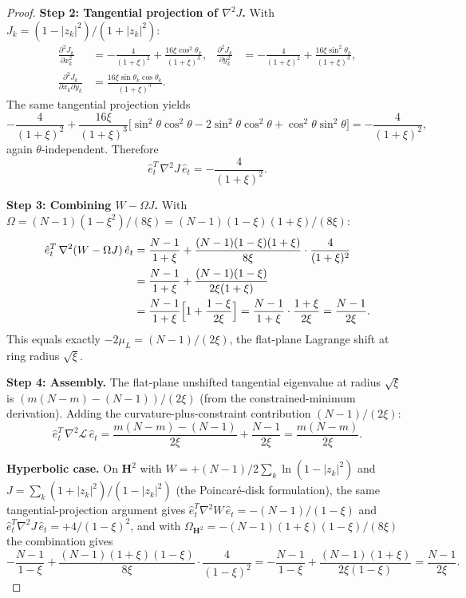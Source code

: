 \documentclass[11pt]{article}
\theoremstyle{remark}
\begin{document}
\begin{proof}
\textbf{Step 2: Tangential projection of $\nabla^2 J$.}
With $J_k = (1 - |z_k|^2)/(1 + |z_k|^2)$:
\begin{align*}
  \frac{\partial^2 J_k}{\partial x_k^2}
    &= -\frac{4}{(1+\xi)^2} + \frac{16\xi\cos^2\!\theta_k}{(1+\xi)^3},
  &
  \frac{\partial^2 J_k}{\partial y_k^2}
    &= -\frac{4}{(1+\xi)^2} + \frac{16\xi\sin^2\!\theta_k}{(1+\xi)^3},
  \\
  \frac{\partial^2 J_k}{\partial x_k\partial y_k}
    &= \frac{16\xi\sin\theta_k\cos\theta_k}{(1+\xi)^3}.
\end{align*}
The same tangential projection yields
\[
  -\frac{4}{(1+\xi)^2}
  + \frac{16\xi}{(1+\xi)^3}\bigl[\sin^2\!\theta\cos^2\!\theta
    - 2\sin^2\!\theta\cos^2\!\theta + \cos^2\!\theta\sin^2\!\theta\bigr]
  = -\frac{4}{(1+\xi)^2},
\]
again $\theta$-independent.  Therefore
\begin{equation}\label{eq:J-tt}
  \hat e_t^T\,\nabla^2 J\,\hat e_t = -\frac{4}{(1+\xi)^2}.
\end{equation}

\textbf{Step 3: Combining $W - \Omega J$.}
With $\Omega = (N-1)(1-\xi^2)/(8\xi) = (N-1)(1-\xi)(1+\xi)/(8\xi)$:
\begin{align*}
  \hat e_t^T\,\nabla^2(W - \Omega J)\,\hat e_t
  &= \frac{N-1}{1+\xi}
     + \frac{(N-1)(1-\xi)(1+\xi)}{8\xi}\cdot\frac{4}{(1+\xi)^2} \\
  &= \frac{N-1}{1+\xi}
     + \frac{(N-1)(1-\xi)}{2\xi(1+\xi)} \\
  &= \frac{N-1}{1+\xi}\Bigl[1 + \frac{1-\xi}{2\xi}\Bigr]
   = \frac{N-1}{1+\xi}\cdot\frac{1+\xi}{2\xi}
   = \frac{N-1}{2\xi}.
\end{align*}
This equals exactly $-2\mu_L = (N-1)/(2\xi)$, the flat-plane Lagrange
shift at ring radius $\sqrt{\xi}$.

\textbf{Step 4: Assembly.}
The flat-plane unshifted tangential eigenvalue at radius $\sqrt{\xi}$ is
$(m(N-m) - (N-1))/(2\xi)$ (from the constrained-minimum derivation).
Adding the curvature-plus-constraint contribution $(N-1)/(2\xi)$:
\[
  \hat e_t^T\,\nabla^2\mathcal{L}\,\hat e_t
  = \frac{m(N-m) - (N-1)}{2\xi} + \frac{N-1}{2\xi}
  = \frac{m(N-m)}{2\xi}.
\]

\textbf{Hyperbolic case.}
On $\mathbf{H}^2$ with $W = +(N{-}1)/2\sum_k\ln(1-|z_k|^2)$ and
$J = \sum_k(1+|z_k|^2)/(1-|z_k|^2)$ (the Poincar\'e-disk
formulation), the same tangential-projection argument gives
$\hat e_t^T\nabla^2 W\,\hat e_t = -(N{-}1)/(1-\xi)$ and
$\hat e_t^T\nabla^2 J\,\hat e_t = +4/(1-\xi)^2$, and with
$\Omega_{\mathbf{H}^2} = -(N{-}1)(1+\xi)(1-\xi)/(8\xi)$ the
combination gives
\[
  -\frac{N{-}1}{1{-}\xi}
  + \frac{(N{-}1)(1{+}\xi)(1{-}\xi)}{8\xi}\cdot\frac{4}{(1{-}\xi)^2}
  = -\frac{N{-}1}{1{-}\xi} + \frac{(N{-}1)(1{+}\xi)}{2\xi(1{-}\xi)}
  = \frac{N{-}1}{2\xi}.
\]
\end{proof}
\end{document}

